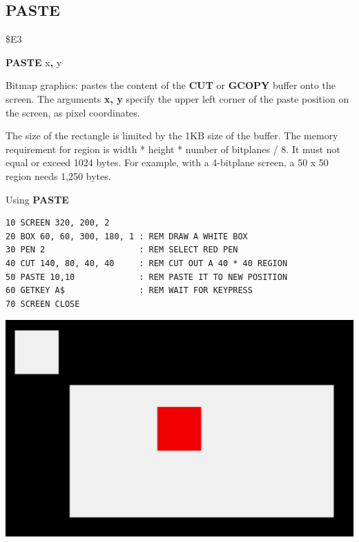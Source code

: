 \subsection{PASTE}
\begin{description}[leftmargin=2cm,style=nextline]
\item [Token:]    \$E3

\item [Format:]   {\bf PASTE} x{\bf,} y

\item [Usage:]    Bitmap graphics: pastes the content of the {\bf CUT} or {\bf GCOPY} buffer onto the screen. The arguments {\bf x, y} specify the upper left corner of the paste position on the screen, as pixel coordinates.

\item [Remarks:]  The size of the rectangle is limited by the 1KB size of the buffer. The memory requirement for region is width * height * number of bitplanes / 8. It must not equal or exceed 1024 bytes. For example, with a 4-bitplane screen, a 50 x 50 region needs 1,250 bytes.

\item [Example:]  Using {\bf PASTE}

\begin{tcolorbox}[colback=black,coltext=white]
\verbatimfont{\codefont}
\begin{verbatim}
10 SCREEN 320, 200, 2
20 BOX 60, 60, 300, 180, 1 : REM DRAW A WHITE BOX
30 PEN 2                   : REM SELECT RED PEN
40 CUT 140, 80, 40, 40     : REM CUT OUT A 40 * 40 REGION
50 PASTE 10,10             : REM PASTE IT TO NEW POSITION
60 GETKEY A$               : REM WAIT FOR KEYPRESS
70 SCREEN CLOSE
\end{verbatim}
\end{tcolorbox}

\item \begin{center}\includegraphics[width=0.7\linewidth]{images/cut.png}\end{center}

\end{description}

